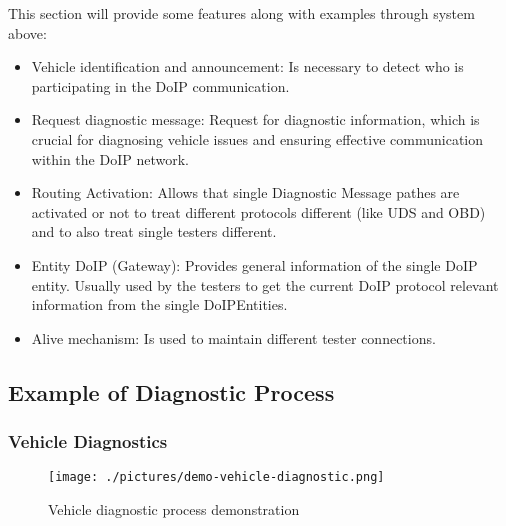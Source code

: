 This section will provide some features along with examples through system above:
\begin{itemize}

    \item Vehicle identification and announcement: Is necessary to detect who is participating in the DoIP communication.

    \item Request diagnostic message: Request for diagnostic information, which is crucial for diagnosing vehicle issues 
    and ensuring effective communication within the DoIP network.

    \item Routing Activation: Allows that single Diagnostic Message pathes are activated or not to treat different protocols 
    different (like UDS and OBD) and to also treat single testers different.
        
    \item Entity DoIP (Gateway): Provides general information of the single DoIP entity. Usually used by the testers to get the
     current DoIP protocol relevant information from the single DoIPEntities.

    \item Alive mechanism: Is used to maintain different tester connections.

\end{itemize}

    \subsection{Example of Diagnostic Process}

        \subsubsection{Vehicle Diagnostics}

            \begin{figure}[htbp]
                \centering
                \texttt{[image: ./pictures/demo-vehicle-diagnostic.png]}
                \caption{Vehicle diagnostic process demonstration}
                \label{fig:2.3}
            \end{figure}

